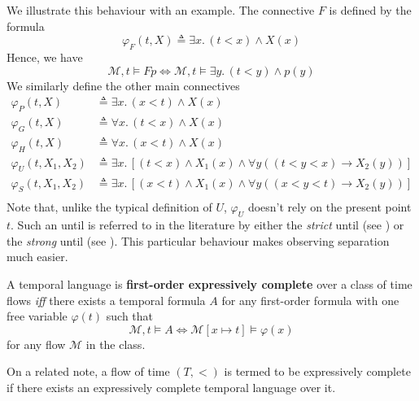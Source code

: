 \documentclass[a4paper,UKenglish,cleveref, autoref, thm-restate, numberwithinsect]{lipics-v2021}
\begin{document}
We illustrate this behaviour with an example. The connective $F$ is defined by the formula
\begin{equation*}
    \varphi_F(t, X) \triangleq \exists x.\, (t < x) \land X(x)
\end{equation*}
Hence, we have
\begin{equation*}
    \mathcal{M}, t \vDash F p \Longleftrightarrow \mathcal{M}, t \vDash \exists y.\, (t < y) \land p(y)
\end{equation*}
We similarly define the other main connectives
\begin{equation*}
    \begin{aligned}
        \varphi_P(t, X) &\triangleq \exists x.\, (x < t) \land X(x)\\
        \varphi_G(t, X) &\triangleq \forall x.\, (t < x) \land X(x)\\
        \varphi_H(t, X) &\triangleq \forall x.\, (x < t) \land X(x)\\
        \varphi_U(t, X_1, X_2) &\triangleq \exists x.\, \left[ \left( t < x \right) \land X_1(x) \land \forall y \left( \left( t < y < x \right) \to X_2(y) \right) \right]\\
        \varphi_S(t, X_1, X_2) &\triangleq \exists x.\, \left[ \left( x < t \right) \land X_1(x) \land \forall y \left( \left( x < y < t \right) \to X_2(y) \right) \right]\\
    \end{aligned}
\end{equation*}
Note that, unlike the typical definition of $U$, $\varphi_U$ doesn’t rely on the present point $t$. Such an until is referred to in the literature by either the \textit{strict} until (see \cite{gastinStrictUntil06}) or the \textit{strong} until (see \cite{BeCl16}). This particular behaviour makes observing separation much easier.

\begin{definition}
    \label{expressive-completeness-definition}
    A temporal language is \textbf{first-order expressively complete} over a class of time flows \textit{iff} there exists a temporal formula $A$ for any first-order formula with one free variable $\varphi(t)$ such that
\begin{equation*}
    \mathcal{M}, t \vDash A \Longleftrightarrow \mathcal{M}[x \mapsto t] \vDash \varphi(x)
\end{equation*}
    for any flow $\mathcal{M}$ in the class.
\end{definition}
On a related note, a flow of time $(T, <)$ is termed to be expressively complete if there exists an expressively complete temporal language over it.
\end{document}
